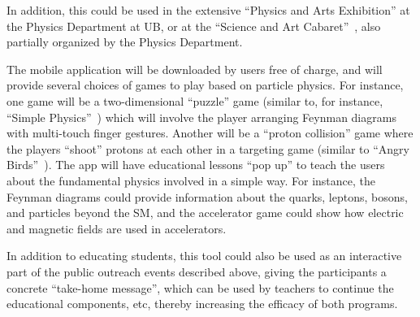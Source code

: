 \documentclass[12pt]{proposalnsf}
\begin{document}
In addition, this could be used in the extensive
``Physics and Arts Exhibition'' at the Physics Department at UB, or at
the ``Science and Art Cabaret''~\cite{cabaret}, also partially
organized by the Physics Department. 


The mobile application will be
downloaded by users free of charge, and will provide several choices
of games to play based on particle physics. 
For instance, one game will be a two-dimensional ``puzzle'' game
(similar to, for instance, ``Simple Physics''~\cite{simplephysics})
which will involve the player arranging Feynman diagrams with
multi-touch finger gestures.
Another will be a ``proton collision'' game where the players
``shoot'' protons at each other in a targeting game (similar to
``Angry Birds''~\cite{angrybirds}). 
The app will have educational lessons ``pop up'' to teach
the users about the fundamental physics involved in a simple way. For
instance, the Feynman diagrams could provide information about the
quarks, leptons, bosons, and particles beyond the SM, and the
accelerator game could show how electric
and magnetic fields are used in accelerators. 

In addition to educating students, this tool
could also be used
as an interactive part of the public outreach events described above,
giving the participants a concrete ``take-home message'', which can be
used by teachers to continue the educational components, etc, thereby
increasing the efficacy of both programs. 
\end{document}
